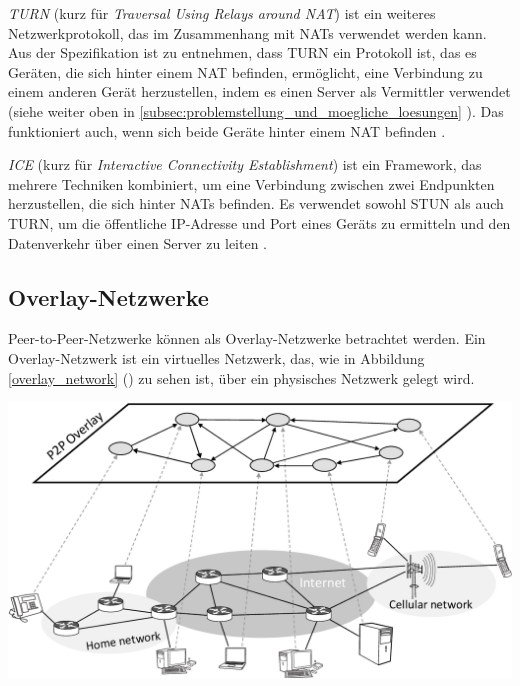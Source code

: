 \textit{TURN} (kurz für \textit{Traversal Using Relays around NAT}) ist ein weiteres Netzwerkprotokoll, das im Zusammenhang mit NATs verwendet werden kann. Aus der Spezifikation ist zu entnehmen, dass TURN ein Protokoll ist, das es Geräten, die sich hinter einem NAT befinden, ermöglicht, eine Verbindung zu einem anderen Gerät herzustellen, indem es einen Server als Vermittler verwendet (siehe weiter oben in \ref{subsec:problemstellung_und_moegliche_loesungen} ). Das funktioniert auch, wenn sich beide Geräte hinter einem NAT befinden \parencite[S. 7]{rfc8656_TURN}.

\textit{ICE} (kurz für \textit{Interactive Connectivity Establishment}) ist ein Framework, das mehrere Techniken kombiniert, um eine Verbindung zwischen zwei Endpunkten herzustellen, die sich hinter NATs befinden. Es verwendet sowohl STUN als auch TURN, um die öffentliche IP-Adresse und Port eines Geräts zu ermitteln und den Datenverkehr über einen Server zu leiten \Parencite[S. 6]{rfc8445_ICE}.


\subsection{Overlay-Netzwerke}
\label{subsec:overlay_netzwerke}

Peer-to-Peer-Netzwerke können als Overlay-Netzwerke betrachtet werden. Ein Overlay-Netzwerk ist ein virtuelles Netzwerk, das, wie in Abbildung \ref{overlay_network} (\textit{}) zu sehen ist, über ein physisches Netzwerk gelegt wird.

\begin{center}
    \captionsetup{type=figure}
    \includegraphics[width=0.9\linewidth]{images/overlay_network.png}
    \label{overlay_network}
\end{center}

